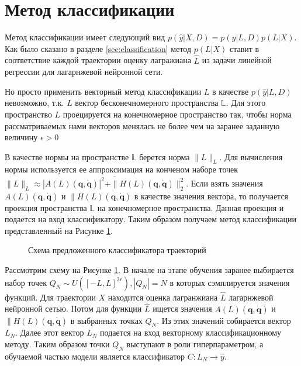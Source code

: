 \documentclass[12pt, twoside]{article}
\begin{document}
\section {Метод классификации}

Метод классификации имеет следующий вид $p(\hat{y}|X, D) = p(\hat{y}|L, D)p(L|X)$. Как было сказано в разделе \ref{sec:classification} метод $p(L|X)$ ставит в соответствие каждой траектории оценку лагражиана $\hat{L}$ из задачи линейной регрессии для лагарнжевой нейронной сети. 

Но просто применить векторный метод классификации $L$ в качестве $p(\hat{y}|L, D)$ невозможно, т.к. $L$ вектор бесконечномерного пространства $\mathbb{L}$. Для этого пространство $L$ проецируется на конечномерное пространство так, чтобы норма рассматриваемых нами векторов менялась не более чем на заранее заданную величину $\epsilon > 0$

В качестве нормы на пространстве $\mathbb{L}$ берется норма $\|L\|_L$. Для вычисления нормы используется ее аппроксимация на конченом наборе точек $\|L\|_L \approx \overline{|A(L)\left(\mathbf{q}, \dot{\mathbf{q}}\right)|^2 + \|H(L)\left(\mathbf{q}, \dot{\mathbf{q}}\right)\|_2^2}$. Если взять значения $A(L)\left(\mathbf{q}, \dot{\mathbf{q}}\right)$ и $\|H(L)\left(\mathbf{q}, \dot{\mathbf{q}}\right)$ в качестве значения вектора, то получается проекция пространства $\mathbb{L}$ на конечномерное пространства. Данная проекция и подается на вход классификатору. Таким образом получаем метод классификации представленный на Рисунке \ref{fig: classificator}.

\begin{figure}[H]
\centering
{}
\caption{Схема предложенного классификатора траекторий}
\label{fig: classificator}
\end{figure}

Рассмотрим схему на Рисунке \ref{fig: classificator}. В начале на этапе обучения заранее выбирается набор точек $Q_N \sim U([-L, L]^{2r}), |Q_N| = N$ в которых сэмплируется значения функций. Для траектории $X$ находится оценка лагранжиана $\hat{L}$ лагарнжевой нейронной сетью. Потом для функции $\hat{L}$ ищется значения $A(L)\left(\mathbf{q}, \dot{\mathbf{q}}\right)$ и $\|H(L)\left(\mathbf{q}, \dot{\mathbf{q}}\right)$ в выбранных точках $Q_N$. Из этих значений собирается вектор $L_N$. Далее этот вектор $L_N$ подается на вход векторному классификационному методу. Таким образом точки  $Q_N$ выступают в роли гиперпараметром, а обучаемой частью модели является классификатор $C: L_N \to \hat{y}$.
\end{document}
